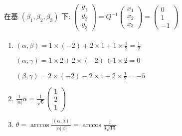 		 在基 \( (\beta_{1}, \beta_{2}, \beta_{3}) \) 下: \(
		 \begin{pmatrix}
			 y_{1} \\
			 y_{2} \\
			 y_{3}\end{pmatrix} = Q^{-1}
		 \begin{pmatrix}
			 x_{1} \\
			 x_{2} \\
			 x_{3}\end{pmatrix} =
		 \begin{pmatrix}
			 0 \\
			 1 \\
			 -1\end{pmatrix} \)

	 \paragraph{} %
		 \begin{enumerate}
			 \item %
			       \( (\alpha, \beta) = 1 \times (-2) + 2 \times 1 + 1 \times \frac{1}{2} = \frac{1}{2} \)

			       \( (\alpha, \gamma) = 1 \times 2 + 2 \times (-2) + 1 \times 2 = 0 \)

			       \( (\beta, \gamma) = 2 \times (-2) - 2 \times 1 + 2 \times \frac{1}{2} = -5 \)
			 \item %
			       \( \frac{1}{|\alpha|}\alpha = \frac{1}{\sqrt{6}}
			       \begin{pmatrix}
				       1 \\
				       2 \\
				       1\end{pmatrix} \)
			 \item %
			       \( \theta = \arccos \frac{|(\alpha, \beta)|}{|\alpha||\beta|} = \arccos \frac{1}{3\sqrt{14}} \)
		 \end{enumerate}

